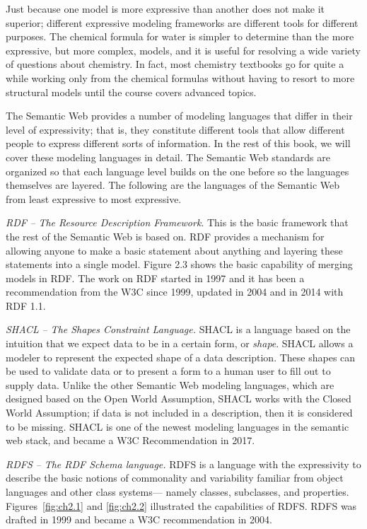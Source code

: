Just because one model is more expressive than another does not make it
superior; different expressive modeling frameworks are different tools
for different purposes. The chemical formula for water is simpler to
determine than the more expressive, but more complex, models, and it is
useful for resolving a wide variety of questions about chemistry. In
fact, most chemistry textbooks go for quite a while working only from
the chemical formulas without having to resort to more structural models
until the course covers advanced topics.

The Semantic Web provides a number of modeling languages that differ in
their level of expressivity; that is, they constitute different tools
that allow different people to express different sorts of information.
In the rest of this book, we will cover these modeling languages in
detail. The Semantic Web standards are organized so that each language
level builds on the one before so the languages themselves are layered.
The following are the languages of the Semantic Web from least
expressive to most expressive.

\emph{RDF} \emph{--} \emph{The Resource Description Framework}. This is
the basic framework that the rest of the Semantic Web is based on. RDF
provides a mechanism for allowing anyone to make a basic statement about
anything and layering these statements into a single model. Figure 2.3
shows the basic capability of merging models in RDF. The work on RDF
started in 1997 and it has been a recommendation from the W3C since
1999, updated in 2004 and in 2014 with RDF 1.1.

\emph{SHACL} \emph{-- The Shapes Constraint Language.} SHACL is a language
based on the intuition that we expect data to be in a certain form, or \emph{shape}.
SHACL allows a modeler to represent the expected shape of a data description. These shapes can be
used to validate data or to present a form to a human user to fill out to supply data.
Unlike the other Semantic Web modeling languages, which are designed based on the Open 
World Assumption, SHACL works with the Closed World Assumption; if data is not 
included in  a description, then it is considered to be missing. 
SHACL is one of the newest modeling languages in the semantic web stack, and became a
W3C Recommendation in 2017. 

\emph{RDFS} \emph{-- The RDF Schema language.} RDFS is a language with
the expressivity to describe the basic notions of commonality and
variability familiar from object languages and other class systems---
namely classes, subclasses, and properties. Figures~\ref{fig:ch2.1} and \ref{fig:ch2.2}
illustrated the capabilities of RDFS. RDFS was drafted in 1999 and
became a W3C recommendation in 2004.

